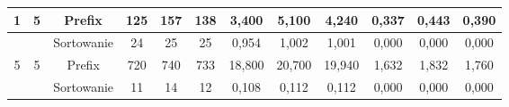 \documentclass[licencjacka]{pracamgr}
\begin{document}
\begin{table}[H]
{\begin{tabular}{@{}cccccccccccc@{}}
1                                                               & 5                                                       & Prefix     & 125                                                     & 157                                                     & 138                                                        & 3,400                                                      & 5,100                                                      & 4,240                                                          & 0,337                                                              & 0,443                                                               & 0,390                                                                 \\ \midrule
                                                                &                                                         & Sortowanie & 24                                                      & 25                                                      & 25                                                         & 0,954                                                      & 1,002                                                      & 1,001                                                          & 0,000                                                              & 0,000                                                               & 0,000                                                                 \\
5                                                               & 5                                                       & Prefix     & 720                                                     & 740                                                     & 733                                                        & 18,800                                                     & 20,700                                                     & 19,940                                                         & 1,632                                                              & 1,832                                                               & 1,760                                                                 \\ \midrule
                                                                &                                                         & Sortowanie & 11                                                      & 14                                                      & 12                                                         & 0,108                                                      & 0,112                                                      & 0,112                                                          & 0,000                                                              & 0,000                                                               & 0,000                                                                 \\

\end{tabular}}
\end{table}
\end{document}
